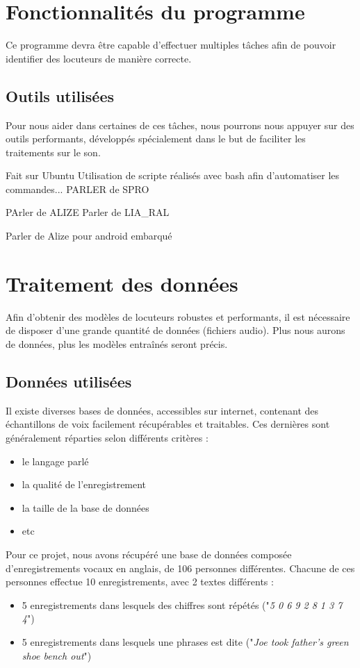 \documentclass[a4paper, 12pt]{book}
\newcounter{program}[subsection]
\begin{document}
\section{Fonctionnalités du programme}

Ce programme devra être capable d'effectuer multiples tâches afin de pouvoir identifier des locuteurs de manière correcte.

\subsection{Outils utilisées}

Pour nous aider dans certaines de ces tâches, nous pourrons nous appuyer sur des outils performants, développés spécialement dans le but de faciliter les traitements sur le son.

Fait sur Ubuntu
Utilisation de scripte réalisés avec bash afin d'automatiser les commandes...
PARLER de SPRO

PArler de ALIZE
Parler de LIA_RAL

Parler de Alize pour android embarqué

\section{Traitement des données}

Afin d'obtenir des modèles de locuteurs robustes et performants, il est nécessaire de disposer d'une grande quantité de données (fichiers audio). Plus nous aurons de données, plus les modèles entraînés seront précis.  

\subsection{Données utilisées\label{data-split}}

Il existe diverses bases de données, accessibles sur internet, contenant des échantillons de voix facilement récupérables et traitables. Ces dernières sont généralement réparties selon différents critères :
\begin{itemize}
  \item le langage parlé
  \item la qualité de l'enregistrement
  \item la taille de la base de données
  \item etc
\end{itemize}

Pour ce projet, nous avons récupéré une base de données composée d'enregistrements vocaux en anglais, de 106 personnes différentes. Chacune de ces personnes effectue 10 enregistrements, avec 2 textes différents :
\begin{itemize}
  \item 5 enregistrements dans lesquels des chiffres sont répétés ("\textit{5 0 6 9 2 8 1 3 7 4}")
  \item 5 enregistrements dans lesquels une phrases est dite ("\textit{Joe took father’s green shoe bench out}")
\end{itemize}
\end{document}
